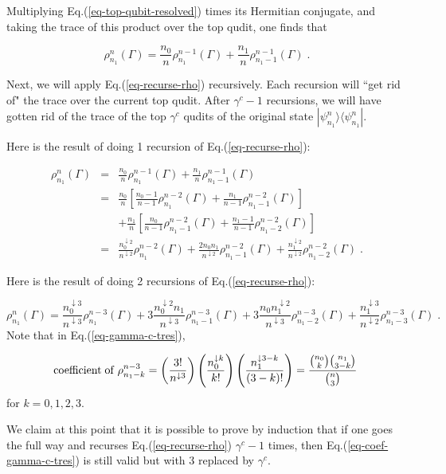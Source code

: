 \documentclass[12pt]{article}%
\newcommand{\bra}[1]{\langle#1|}
\newcommand{\ket}[1]{|#1\rangle}
\newcommand{\beq}{\begin{equation}}
\newcommand{\eeq}{\end{equation}}
\newcommand{\beqa}{\begin{eqnarray}}
\newcommand{\eeqa}{\end{eqnarray}}
\newcommand{\darrow}[0]{{\downarrow}}
\begin{document}
{Multiplying Eq.(\ref{eq-top-qubit-resolved})
times its Hermitian conjugate,
and taking the trace
of this product over the top qudit,
one finds that

\beq
\rho^{n}_{n_1}(\Gamma)=
\frac{n_0}{n}\rho^{n-1}_{n_1}(\Gamma)
+
\frac{n_1}{n}\rho^{n-1}_{n_1-1}(\Gamma)
\;.
\label{eq-recurse-rho}
\eeq

Next, we will apply Eq.(\ref{eq-recurse-rho})
recursively. Each recursion will
``get rid of" the trace over the current top qudit.
After $\gamma^c-1$ recursions, we will have
gotten rid of the trace of the top
$\gamma^c$ qudits of the original
state $\ket{\psi^n_{n_1}}
\bra{\psi^n_{n_1}}$.


Here is the result of doing 1
 recursion of Eq.(\ref{eq-recurse-rho}):

\beqa
\rho^{n}_{n_1}(\Gamma)&=&
\frac{n_0}{n}\rho^{n-1}_{n_1}(\Gamma)
+
\frac{n_1}{n}\rho^{n-1}_{n_1-1}(\Gamma)
\\
&=&
\frac{n_0}{n}
\left[
\frac{n_0-1}{n-1}\rho^{n-2}_{n_1}(\Gamma)
+
\frac{n_1}{n-1}\rho^{n-2}_{n_1-1}(\Gamma)
\right]
\\
&& +
\frac{n_1}{n}
\left[
\frac{n_0}{n-1}\rho^{n-2}_{n_1-1}(\Gamma)
+
\frac{n_1-1}{n-1}\rho^{n-2}_{n_1-2}(\Gamma)
\right]
\\
&=&
\frac{n_0^{\darrow 2}}{n^{\darrow 2}}
\rho^{n-2}_{n_1}(\Gamma)
+
\frac{2n_0 n_1}{n^{\darrow 2}}
\rho^{n-2}_{n_1-1}(\Gamma)
+
\frac{n_1^{\darrow 2}}{n^{\darrow 2}}
\rho^{n-2}_{n_1-2}(\Gamma)
\;.
\eeqa

Here is the result of doing 2 recursions
of Eq.(\ref{eq-recurse-rho}):

\beq
\rho^{n}_{n_1}(\Gamma)=
\frac{n_0^{\darrow 3}}{n^{\darrow 3}}
\rho^{n-3}_{n_1}(\Gamma)
+
3\frac{n_0^{\darrow 2}n_1}{n^{\darrow 3}}
\rho^{n-3}_{n_1-1}(\Gamma)
+
3\frac{n_0 n_1^{\darrow 2}}{n^{\darrow 3}}
\rho^{n-3}_{n_1-2}(\Gamma)
+
\frac{n_1^{\darrow 3}}{n^{\darrow 2}}
\rho^{n-3}_{n_1-3}(\Gamma)
\;.
\label{eq-gamma-c-tres}
\eeq
Note that in Eq.(\ref{eq-gamma-c-tres}),

\beq
{\rm coefficient\;of\;}
\rho^{n-3}_{n_1-k} =
\left(\frac{3!}{n^{\darrow 3}}\right)
\left(\frac{n_0^{\darrow k}}{k!}\right)
\left(\frac{n_1^{\darrow 3-k}}{(3-k)!}\right)
=
\frac{{n_0\choose k}{n_1 \choose 3-k}}{{n\choose 3}}
\;
\label{eq-coef-gamma-c-tres}
\eeq
for $k=0,1,2,3$.

We claim at this point
that it is possible
to prove by induction
that if one goes the full way and recurses
Eq.(\ref{eq-recurse-rho}) $\gamma^c-1$
times, then
Eq.(\ref{eq-coef-gamma-c-tres})
is still valid but with
3 replaced by $\gamma^c$.

}
\end{document}
